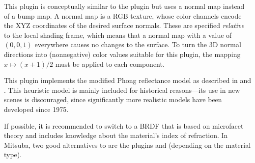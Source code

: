 This plugin is conceptually similar to the  plugin
but uses a normal map instead of a bump map. A normal map is a RGB texture, whose color channels
encode the XYZ coordinates of the desired surface normals.
These are specified \emph{relative} to the local shading frame,
which means that a normal map with a value of $(0,0,1)$ everywhere
causes no changes to the surface.
To turn the 3D normal directions into (nonnegative) color values
suitable for this plugin, the
mapping $x \mapsto (x+1)/2$ must be applied to each component.

This plugin implements the modified Phong reflectance model as described in
\cite{Phong1975Illumination} and \cite{Lafortune1994Using}. This heuristic
model is mainly included for historical reasons---its use in new scenes is
discouraged, since significantly more realistic models have been developed
since 1975.

If possible, it is recommended to switch to a BRDF that is based on
microfacet theory and includes knowledge about the material's index of
refraction. In Mitsuba, two good alternatives to  are
the plugins  and 
(depending on the material type).

